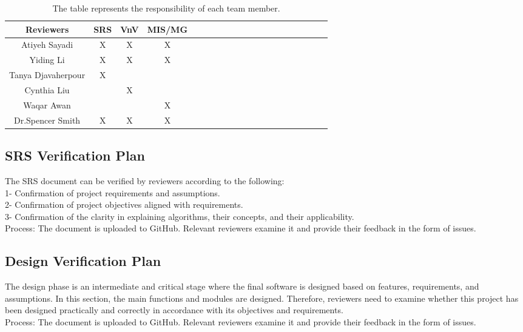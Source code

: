 \documentclass[12pt, titlepage]{article}
\begin{document}
\begin{table}[h!]
\centering
\begin{tabular}{|c|c|c|c|c|c|c|c|c|c|c|c|c|c|c|c|c|c|c|c|}
\hline
 \textbf{Reviewers	}& \textbf{SRS }& \textbf{VnV}& \textbf{MIS/MG} \\
\hline
Atiyeh Sayadi& X& X& X \\ \hline
Yiding Li & X& X& X \\ \hline
Tanya Djavaherpour& X&  & \\ \hline
Cynthia Liu&  & X& \\ \hline
Waqar Awan& & & X \\ \hline
Dr.Spencer Smith& X& X& X \\ \hline
\end{tabular}
\caption{The table represents the responsibility of each team member. }
\label{Table:2}
\end{table}

\newpage
\subsection{SRS Verification Plan}

The SRS document can be verified by reviewers according to the following:\\
1- Confirmation of project requirements and assumptions.\\
2- Confirmation of project objectives aligned with requirements.\\
3- Confirmation of the clarity in explaining algorithms, their concepts, and their applicability.\\

Process: The document is uploaded to GitHub. Relevant reviewers examine it and provide their feedback in the form of issues.

\subsection{Design Verification Plan}
The design phase is an intermediate and critical stage where the final software is designed based on features, requirements, and assumptions. In this section, the main functions and modules are designed. Therefore, reviewers need to examine whether this project has been designed practically and correctly in accordance with its objectives and requirements.\\

Process: The document is uploaded to GitHub. Relevant reviewers examine it and provide their feedback in the form of issues.
\end{document}
